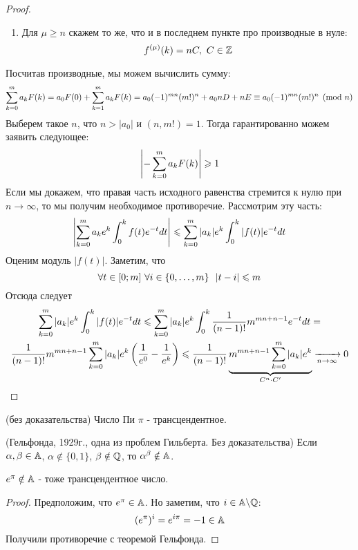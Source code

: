\begin{proof}
\begin{itemize}
\begin{enumerate}
			\item Для $\mu \ge n$ скажем то же, что и в последнем пункте про производные в нуле:
			\[
				f^{(\mu)}(k) = nC,\ C \in \mathbb{Z}
			\]
		\end{enumerate}
	\end{itemize}
	Посчитав производные, мы можем вычислить сумму:
	\[
		\sum\limits_{k = 0}^m a_k F(k) = a_0 F(0) + \sum\limits_{k = 1}^m a_k F(k) = a_0 (-1)^{mn}(m!)^n + a_0 nD + nE \equiv a_0 (-1)^{mn} (m!)^n \pmod n
	\]
	Выберем такое $n$, что $n > |a_0|$ и $(n, m!) = 1$. Тогда гарантированно можем заявить следующее:
	\[
		\left|-\sum\limits_{k = 0}^m a_k F(k)\right| \geqslant 1
	\]
	Если мы докажем, что правая часть исходного равенства стремится к нулю при $n \to \infty$, то мы получим необходимое противоречие. Рассмотрим эту часть:
	\[
		\left|\sum_{k = 0}^m a_k e^k \int_0^k f(t) e^{-t} dt\right| \leqslant \sum\limits_{k = 0}^m |a_k| e^k \int_0^k |f(t)| e^{-t} dt
	\]
	Оценим модуль $|f(t)|$. Заметим, что
	\[
		\forall t \in [0; m]\ \forall i \in \{0, \ldots, m\}\ \ |t - i| \leqslant m
	\]
	Отсюда следует
	\begin{multline*}
		\sum\limits_{k = 0}^m |a_k|e^k \int_0^k |f(t)|e^{-t} dt \leqslant \sum\limits_{k = 0}^m |a_k|e^k \int_0^k \frac{1}{(n - 1)!} m^{mn + n - 1} e^{-t} dt =
		\\
		\frac{1}{(n - 1)!} m^{mn + n - 1} \sum\limits_{k = 0}^m |a_k| e^k \left(\frac{1}{e^0} - \frac{1}{e^k}\right) \leqslant \frac{1}{(n - 1)!} \underbrace{m^{mn + n - 1} \sum\limits_{k = 0}^m |a_k|e^k}_{C^n \cdot C'} \xrightarrow[n \to \infty]{} 0
	\end{multline*}
\end{proof}

\begin{theorem} (без доказательства)
	Число Пи $\pi$ - трансцендентное.
\end{theorem}

\begin{theorem} (Гельфонда, 1929г., одна из проблем Гильберта. Без доказательства)
	Если $\alpha, \beta \in \mathbb{A}$, $\alpha \notin \{0, 1\}$, $\beta \notin \mathbb{Q}$, то $\alpha^\beta \notin \mathbb{A}$.
\end{theorem}

\begin{corollary}
	$e^\pi \notin \mathbb{A}$ - тоже трансцендентное число.
\end{corollary}

\begin{proof}
	Предположим, что $e^\pi \in \mathbb{A}$. Но заметим, что $i \in \mathbb{A} \backslash \mathbb{Q}$:
	\[
		(e^\pi)^i = e^{i\pi} = -1 \in \mathbb{A}
	\]
	Получили противоречие с теоремой Гельфонда.
\end{proof}

